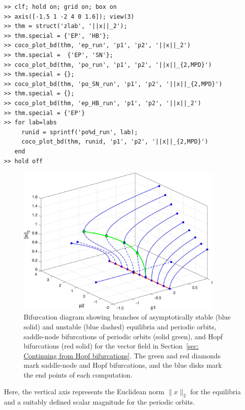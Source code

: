 \begin{lstlisting}[language=coco-highlight,frame=lines]
>> clf; hold on; grid on; box on
>> axis([-1.5 1 -2 4 0 1.6]); view(3)
>> thm = struct('zlab', '||x||_2');
>> thm.special = {'EP', 'HB'};
>> coco_plot_bd(thm, 'ep_run', 'p1', 'p2', '||x||_2')
>> thm.special =  {'EP', 'SN'};
>> coco_plot_bd(thm, 'po_run', 'p1', 'p2', '||x||_{2,MPD}')
>> thm.special = {};
>> coco_plot_bd(thm, 'po_SN_run', 'p1', 'p2', '||x||_{2,MPD}')
>> thm.special = {};
>> coco_plot_bd(thm, 'ep_HB_run', 'p1', 'p2', '||x||_2')
>> thm.special = {'EP'}
>> for lab=labs
     runid = sprintf('po%d_run', lab);
     coco_plot_bd(thm, runid, 'p1', 'p2', '||x||_{2,MPD}')
   end
>> hold off
\end{lstlisting}
\begin{figure}[h]
\centering
\includegraphics[width=4in]{Figures/Section4_1_1.jpg}
\caption{Bifurcation diagram showing branches of asymptotically stable (blue solid) and unstable (blue dashed) equilibria and periodic orbits, saddle-node bifurcations of periodic orbits (solid green), and Hopf bifurcations (red solid) for the vector field in Section~\ref{sec: Continuing from Hopf bifurcations}. The green and red diamonds mark saddle-node and Hopf bifurcations, and the blue disks mark the end points of each computation.}
\label{fig: Section4_1_1}
\end{figure}
Here, the vertical axis represents the Euclidean norm $\|x\|_2$ for the equilibria and a suitably defined scalar magnitude for the periodic orbits.

